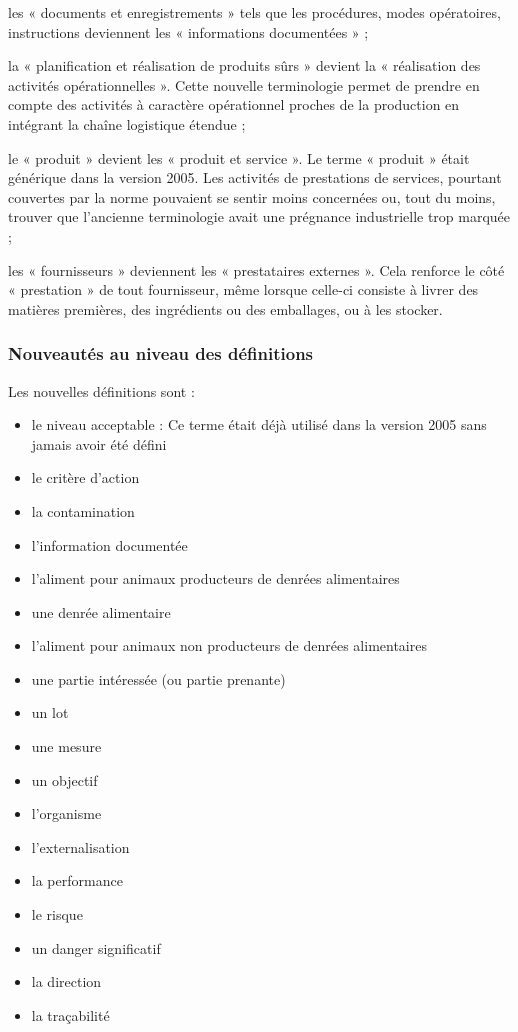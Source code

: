 \begin{spacing}{1.2}
les « documents et enregistrements » tels que les procédures, modes opératoires, instructions deviennent les « informations documentées » ;




la « planification et réalisation de produits sûrs » devient la « réalisation des activités opérationnelles ». Cette nouvelle terminologie permet de prendre en compte des activités à caractère opérationnel proches de la production en intégrant la chaîne logistique étendue ;






le « produit » devient les « produit et service ». Le terme « produit » était générique dans la version 2005. Les activités de prestations de services, pourtant couvertes par la norme pouvaient se sentir moins concernées ou, tout du moins, trouver que l’ancienne terminologie avait une prégnance industrielle trop marquée ;





les « fournisseurs » deviennent les « prestataires externes ». Cela renforce le côté « prestation » de tout fournisseur, même lorsque celle-ci consiste à livrer des matières premières, des ingrédients ou des emballages, ou à les stocker.



\subsubsection{Nouveautés au niveau des définitions}
Les nouvelles définitions sont :


\begin{itemize}
	\item  le niveau acceptable : Ce terme était déjà utilisé dans la version 2005 sans jamais  avoir été défini
	\item  le critère d’action
	\item  la contamination
	\item  l’information documentée
	\item  l’aliment pour animaux producteurs de denrées alimentaires
	\item  une denrée alimentaire
	\item  l’aliment pour animaux non producteurs de denrées alimentaires
	\item  une partie intéressée (ou partie prenante)
	\item  un lot
	\item  une mesure
	\item  un objectif
	\item  l’organisme
	\item  l’externalisation
	\item  la performance
	\item  le risque
	\item  un danger significatif
	\item  la direction
	\item  la traçabilité
\end{itemize}




\end{spacing}
